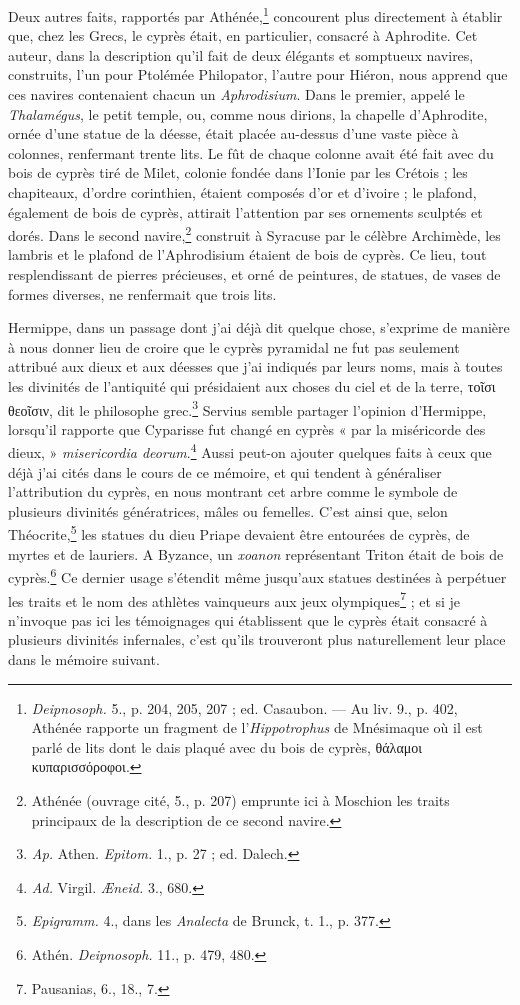 \documentclass{article}
\begin{document}
Deux autres faits, rapportés par Athénée,\footnote{\emph{Deipnosoph.} 5., p. 204, 205, 207 ; ed. Casaubon. --- Au liv. 9., p. 402, Athénée rapporte un fragment de l'\emph{Hippotrophus} de Mnésimaque où il est parlé de lits dont le dais plaqué avec du bois de cyprès, \textgreek{θάλαμοι κυπαρισσόροφοι}.} concourent plus directement à établir que, chez les Grecs, le cyprès était, en particulier, consacré à Aphrodite. Cet auteur, dans la description qu'il fait de deux élégants et somptueux navires, construits, l'un pour Ptolémée Philopator, l'autre pour Hiéron, nous apprend que ces navires contenaient chacun un \emph{Aphrodisium}. Dans le premier, appelé le \emph{Thalamégus}, le petit temple, ou, comme nous dirions, la chapelle d'Aphrodite, ornée d'une statue de la déesse, était placée au-dessus d'une vaste pièce à colonnes, renfermant trente lits. Le fût de chaque colonne avait été fait avec du bois de cyprès tiré de Milet, colonie fondée dans l'Ionie par les Crétois ; les chapiteaux, d'ordre corinthien, étaient composés d'or et d'ivoire ; le plafond, également de bois de cyprès, attirait l'attention par ses ornements sculptés et dorés. Dans le second navire,\footnote{Athénée (ouvrage cité, 5., p. 207) emprunte ici à Moschion les traits principaux de la description de ce second navire.} construit à Syracuse par le célèbre Archimède, les lambris et le plafond de l'Aphrodisium étaient de bois de cyprès. Ce lieu, tout resplendissant de pierres précieuses, et orné de peintures, de statues, de vases de formes diverses, ne renfermait que trois lits.

Hermippe, dans un passage dont j'ai déjà dit quelque chose, s'exprime de manière à nous donner lieu de croire que le cyprès pyramidal ne fut pas seulement attribué aux dieux et aux déesses que j'ai indiqués par leurs noms, mais à toutes les divinités de l'antiquité qui présidaient aux choses du ciel et de la terre, \textgreek{τοῖσι θεοῖσιν}, dit le philosophe grec.\footnote{\emph{Ap.} Athen. \emph{Epitom.} 1., p. 27 ; ed. Dalech.} Servius semble partager l'opinion d'Hermippe, lorsqu'il rapporte que Cyparisse fut changé en cyprès « par la miséricorde des dieux, » \emph{misericordia deorum}.\footnote{\emph{Ad.} Virgil. \emph{Æneid.} 3., 680.} Aussi peut-on ajouter quelques faits à ceux que déjà j'ai cités dans le cours de ce mémoire, et qui tendent à généraliser l'attribution du cyprès, en nous montrant cet arbre comme le symbole de plusieurs divinités génératrices, mâles ou femelles. C'est ainsi que, selon Théocrite,\footnote{\emph{Epigramm.} 4., dans les \emph{Analecta} de Brunck, t. 1., p. 377.} les statues du dieu Priape devaient être entourées de cyprès, de myrtes et de lauriers. A Byzance, un \emph{xoanon} représentant Triton était de bois de cyprès.\footnote{Athén. \emph{Deipnosoph.} 11., p. 479, 480.} Ce dernier usage s'étendit même jusqu'aux statues destinées à perpétuer les traits et le nom des athlètes vainqueurs aux jeux olympiques\footnote{Pausanias, 6., 18., 7.} ; et si je n'invoque pas ici les témoignages qui établissent que le cyprès était consacré à plusieurs divinités infernales, c'est qu'ils trouveront plus naturellement leur place dans le mémoire suivant.
\end{document}
